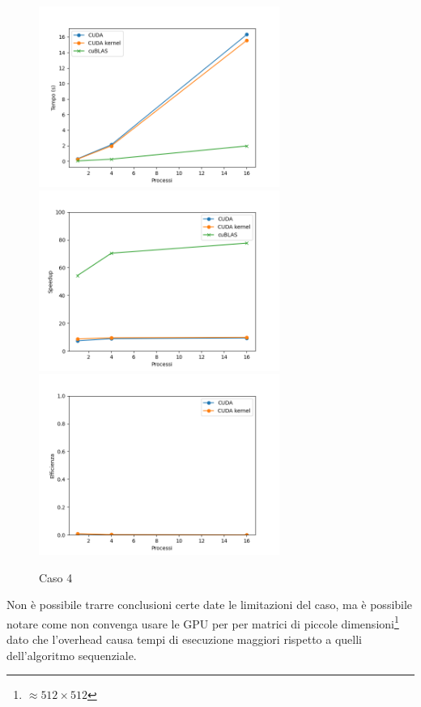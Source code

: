 \begin{figure}[ht]
    \centering
    \includegraphics[width=0.7\textwidth]{./imgs/graphs/caso_d.png}
    \includegraphics[width=0.7\textwidth]{./imgs/graphs/caso_d_speedup.png}
    \includegraphics[width=0.7\textwidth]{./imgs/graphs/caso_d_efficiency.png}
    \caption{Caso 4}
\end{figure}

Non è possibile trarre conclusioni certe date le limitazioni del caso, ma è possibile notare come non convenga usare le GPU per per matrici di piccole dimensioni\footnote{$\approx 512 \times 512$} dato che l'overhead causa tempi di esecuzione maggiori rispetto a quelli dell'algoritmo sequenziale.

